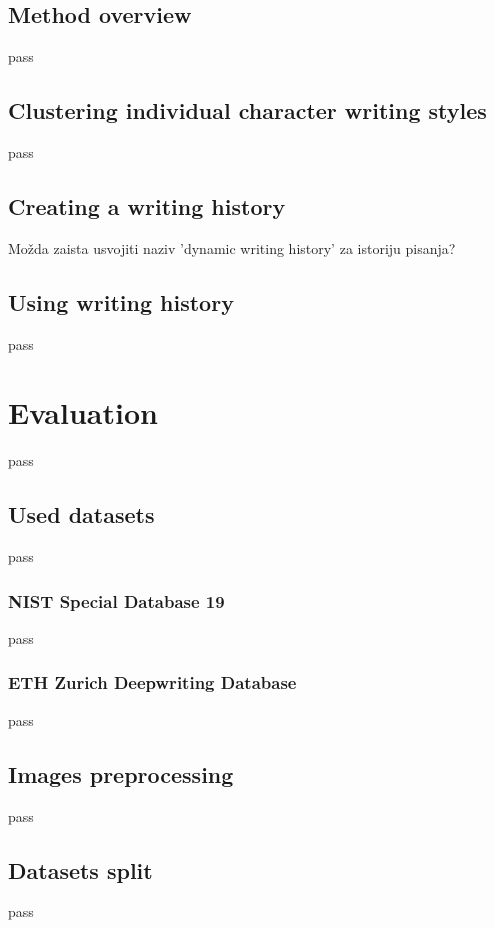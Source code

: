 \documentclass{article}
\begin{document}
\subsection{Method overview}
pass 

\subsection{Clustering individual character writing styles}
pass 

\subsection{Creating a writing history}
Možda zaista usvojiti naziv 'dynamic writing history' za istoriju pisanja?

\subsection{Using writing history}
pass


\section{Evaluation}
pass

\subsection{Used datasets}
pass

\subsubsection{NIST Special Database 19}
pass

\subsubsection{ETH Zurich Deepwriting Database}
pass

\subsection{Images preprocessing}
pass

\subsection{Datasets split}
pass
\end{document}
